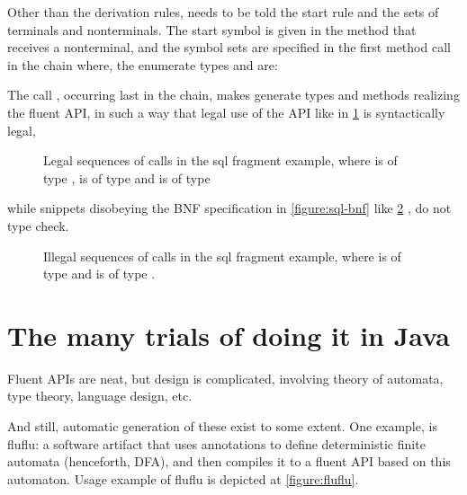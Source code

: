 Other than the derivation rules, \Fajita needs to be told the start rule 
  and the sets of terminals and nonterminals.
The start symbol is given in the  method that receives a nonterminal,
and the symbol sets are specified in the first method call in the chain where,
  the enumerate types  and  are:

\begin{quote}
\end{quote}

The call , occurring last in the chain, makes \Fajita generate types
and methods realizing the fluent API, in such a way that legal use of the API
like in \cref{figure:sql:legal} is syntactically legal,

\begin{figure}[H]
  \caption{\label{figure:sql:legal}
  Legal sequences of calls in the sql fragment example,
  where  is of type ,  is of type  and 
  is of type }

\end{figure}

while snippets disobeying the BNF specification in \cref{figure:sql-bnf} like
\cref{figure:sql:illegal} , do not type check.

\begin{figure}[H]
  \caption{\label{figure:sql:illegal}
  Illegal sequences of calls in the sql fragment example,
  where  is of type  and  is of type .}
\end{figure}

\section{The many trials of doing it in Java}
Fluent APIs are neat, but design is complicated,
involving theory of automata, type theory, language design, etc.

And still, automatic generation of these exist to some extent.
One example, is fluflu: a software artifact that uses
\Java annotations to define deterministic finite automata (henceforth, DFA), and then
compiles it to a fluent API based on this automaton. Usage example of fluflu is
depicted at \cref{figure:fluflu}.

